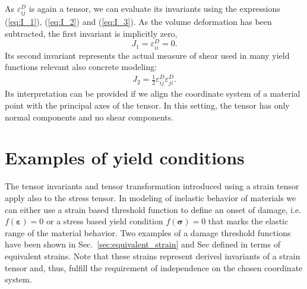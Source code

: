 \documentclass[main.tex]{subfiles}
\begin{document}
As $\varepsilon_{ij}^{D}$ is again a tensor, we can evaluate its invariants using the expressions (\ref{eq:I_1}), (\ref{eq:I_2}) and (\ref{eq:I_3}). 
As the volume deformation has been subtracted, the first invariant is implicitly zero,
\[
 J_1 = \varepsilon^{D}_{ii} = 0.
\]
Its second invariant represents the actual measure of shear used in many yield functions relevant also  concrete modeling:
\begin{align}
    \label{EQ:second_deviatoric_invariant}
    J_2 = \frac{1}{2} \varepsilon^{D}_{ij} \varepsilon^{D}_{ji}.
\end{align}
Its interpretation can be provided if we align the coordinate system of a material point with the principal axes of the tensor. In this setting, the tensor has only normal components and no shear components.

\section{Examples of yield conditions}

The tensor invariants and tensor transformation introduced using a strain tensor apply also to the stress tensor. In modeling of inelastic behavior of materials we can either use a strain based threshold function to define an onset of damage, i.e. $f(\boldsymbol{\varepsilon}) = 0$ or a stress based yield condition  $f(\boldsymbol{\sigma}) = 0$ that marks the elastic range of the material behavior.  
Two examples of a damage threshold functions have been shown in Sec.~\ref{sec:equivalent_strain} and Sec
defined in terms of equivalent strains. Note that these strains represent derived invariants of a strain tensor and, thus, fulfill the requirement of independence on the chosen coordinate system.
\end{document}
